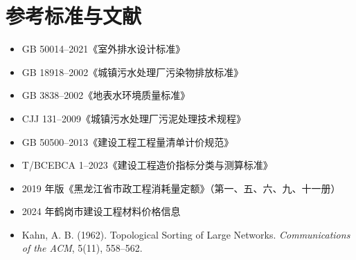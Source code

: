 \documentclass[12pt,a4paper]{ctexart}
\theoremstyle{definition}
\theoremstyle{remark}
\begin{document}
\section*{参考标准与文献}

\begin{itemize}
  \item GB 50014--2021《室外排水设计标准》
  \item GB 18918--2002《城镇污水处理厂污染物排放标准》
  \item GB 3838--2002《地表水环境质量标准》
  \item CJJ 131--2009《城镇污水处理厂污泥处理技术规程》
  \item GB 50500--2013《建设工程工程量清单计价规范》
  \item T/BCEBCA 1--2023《建设工程造价指标分类与测算标准》
  \item 2019 年版《黑龙江省市政工程消耗量定额》（第一、五、六、九、十一册）
  \item 2024 年鹤岗市建设工程材料价格信息
  \item Kahn, A. B. (1962). Topological Sorting of Large Networks. \textit{Communications of the ACM}, 5(11), 558--562.
\end{itemize}
\end{document}
